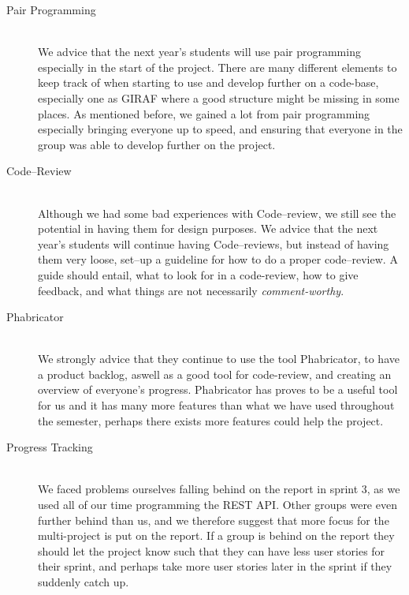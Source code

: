 \begin{description}
	\item[Pair Programming] \hfill \\
	We advice that the next year's students will use pair programming especially in the start of the project.
	There are many different elements to keep track of when starting to use and develop further on a code-base, especially one as GIRAF where a good structure might be missing in some places. 
	As mentioned before, we gained a lot from pair programming especially bringing everyone up to speed, and ensuring that everyone in the group was able to develop further on the project.

	\item[Code--Review] \hfill \\
	Although we had some bad experiences with Code--review, we still see the potential in having them for design purposes.
	We advice that the next year's students will continue having Code--reviews, but instead of having them very loose, set--up a guideline for how to do a proper code--review.
	A guide should entail, what to look for in a code-review, how to give feedback, and what things are not necessarily \textit{comment-worthy}.

	\item[Phabricator] \hfill \\
	We strongly advice that they continue to use the tool Phabricator, to have a product backlog, aswell as a good tool for code-review, and creating an overview of everyone's progress.
	Phabricator has proves to be a useful tool for us and it has many more features than what we have used throughout the semester, perhaps there exists more features could help the project.


	\item[Progress Tracking] \hfill \\
	We faced problems ourselves falling behind on the report in sprint 3, as we used all of our time programming the REST API.
	Other groups were even further behind than us, and we therefore suggest that more focus for the multi-project is put on the report.
	If a group is behind on the report they should let the project know such that they can have less user stories for their sprint, and perhaps take more user stories later in the sprint if they suddenly catch up. 


\end{description}
